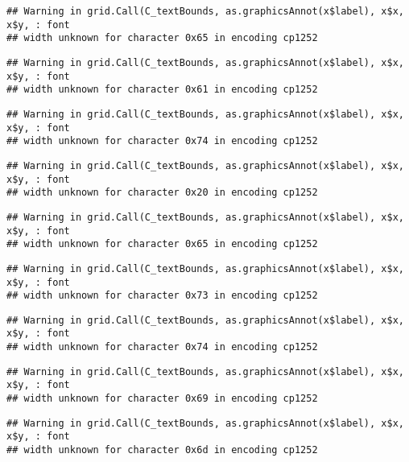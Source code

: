 \documentclass[
]{article}
\begin{document}
\begin{verbatim}
## Warning in grid.Call(C_textBounds, as.graphicsAnnot(x$label), x$x, x$y, : font
## width unknown for character 0x65 in encoding cp1252
\end{verbatim}

\begin{verbatim}
## Warning in grid.Call(C_textBounds, as.graphicsAnnot(x$label), x$x, x$y, : font
## width unknown for character 0x61 in encoding cp1252
\end{verbatim}

\begin{verbatim}
## Warning in grid.Call(C_textBounds, as.graphicsAnnot(x$label), x$x, x$y, : font
## width unknown for character 0x74 in encoding cp1252
\end{verbatim}

\begin{verbatim}
## Warning in grid.Call(C_textBounds, as.graphicsAnnot(x$label), x$x, x$y, : font
## width unknown for character 0x20 in encoding cp1252
\end{verbatim}

\begin{verbatim}
## Warning in grid.Call(C_textBounds, as.graphicsAnnot(x$label), x$x, x$y, : font
## width unknown for character 0x65 in encoding cp1252
\end{verbatim}

\begin{verbatim}
## Warning in grid.Call(C_textBounds, as.graphicsAnnot(x$label), x$x, x$y, : font
## width unknown for character 0x73 in encoding cp1252
\end{verbatim}

\begin{verbatim}
## Warning in grid.Call(C_textBounds, as.graphicsAnnot(x$label), x$x, x$y, : font
## width unknown for character 0x74 in encoding cp1252
\end{verbatim}

\begin{verbatim}
## Warning in grid.Call(C_textBounds, as.graphicsAnnot(x$label), x$x, x$y, : font
## width unknown for character 0x69 in encoding cp1252
\end{verbatim}

\begin{verbatim}
## Warning in grid.Call(C_textBounds, as.graphicsAnnot(x$label), x$x, x$y, : font
## width unknown for character 0x6d in encoding cp1252
\end{verbatim}
\end{document}
